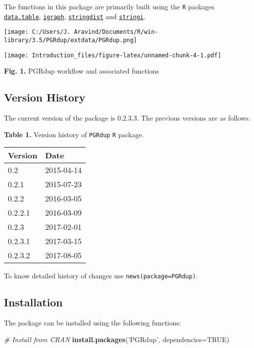 \documentclass[]{article}
\newenvironment{Shaded}{\begin{snugshade}}{\end{snugshade}}
\newcommand{\CommentTok}[1]{\textcolor[rgb]{0.56,0.35,0.01}{\textit{#1}}}
\newcommand{\DataTypeTok}[1]{\textcolor[rgb]{0.13,0.29,0.53}{#1}}
\newcommand{\KeywordTok}[1]{\textcolor[rgb]{0.13,0.29,0.53}{\textbf{#1}}}
\newcommand{\NormalTok}[1]{#1}
\newcommand{\OtherTok}[1]{\textcolor[rgb]{0.56,0.35,0.01}{#1}}
\newcommand{\StringTok}[1]{\textcolor[rgb]{0.31,0.60,0.02}{#1}}
\begin{document}
The functions in this package are primarily built using the \texttt{R}
packages
\href{https://CRAN.R-project.org/package=data.table}{\texttt{data.table}},
\href{https://CRAN.R-project.org/package=igraph}{\texttt{igraph}},
\href{https://CRAN.R-project.org/package=stringdist}{\texttt{stringdist}}
and \href{https://CRAN.R-project.org/package=stringi}{\texttt{stringi}}.

\clearpage
\pagebreak

\begin{center}
    \texttt{[image: C:/Users/J. Aravind/Documents/R/win-library/3.5/PGRdup/extdata/PGRdup.png]}
\end{center}

\texttt{[image: Introduction\_files/figure-latex/unnamed-chunk-4-1.pdf]}

\textbf{Fig. 1.} PGRdup workflow and associated functions

\hypertarget{version-history}{%
\subsection{Version History}\label{version-history}}

The current version of the package is 0.2.3.3. The previous versions are
as follows.

\textbf{Table 1.} Version history of \texttt{PGRdup} \texttt{R} package.

\begin{longtable}[]{@{}ll@{}}
\toprule
Version & Date\tabularnewline
\midrule
\endhead
0.2 & 2015-04-14\tabularnewline
0.2.1 & 2015-07-23\tabularnewline
0.2.2 & 2016-03-05\tabularnewline
0.2.2.1 & 2016-03-09\tabularnewline
0.2.3 & 2017-02-01\tabularnewline
0.2.3.1 & 2017-03-15\tabularnewline
0.2.3.2 & 2017-08-05\tabularnewline
\bottomrule
\end{longtable}

To know detailed history of changes use
\texttt{news(package=\textquotesingle{}PGRdup\textquotesingle{})}.

\pagebreak

\hypertarget{installation}{%
\subsection{Installation}\label{installation}}

The package can be installed using the following functions:

\begin{Shaded}
\begin{Highlighting}[]
\CommentTok{# Install from CRAN}
\KeywordTok{install.packages}\NormalTok{(}\StringTok{'PGRdup'}\NormalTok{, }\DataTypeTok{dependencies=}\OtherTok{TRUE}\NormalTok{)}
\end{Highlighting}
\end{Shaded}
\end{document}
